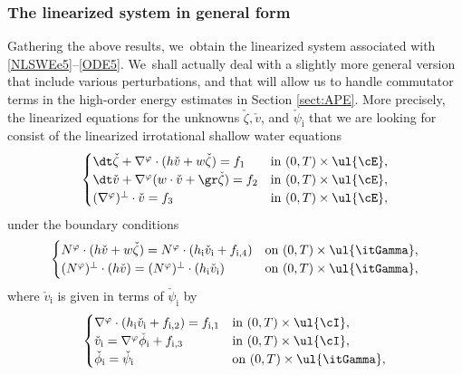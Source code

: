 \subsubsection{The linearized system in general form}
Gathering the above results, we~obtain the linearized system associated with \eqref{NLSWEe5}--\eqref{ODE5}. We~shall actually deal with a slightly more general version that include various perturbations,
and that will allow us to handle commutator terms in the high-order energy estimates in Section \ref{sect:APE}.
More precisely, the linearized equations for the unknowns $\check{\zeta},\check{v}$, and $\check{\psi}_\mathrm{i}$
that we are looking for consist of the linearized irrotational shallow water equations
\begin{equation}\label{LSWEe2}
\begin{cases}
\dt\check{\zeta}+\nabla^\varphi\cdot(h\check{v}+w\check{\zeta}) = f_1 &\text{in } (0,T)\times\ul{\cE}, \\
\dt\check{v}+\nabla^\varphi(w\cdot\check{v}+\gr\check{\zeta}) = f_2 &\text{in } (0,T)\times\ul{\cE}, \\
(\nabla^\varphi)^\perp\cdot\check{v} = f_3 &\text{in } (0,T)\times\ul{\cE},
\end{cases}
\end{equation}
under the boundary conditions
\begin{equation}\label{LBC4}
\begin{cases}
N^\varphi\cdot(h\check{v}+w\check{\zeta}) = N^\varphi\cdot(h_\mathrm{i}\check{v}_\mathrm{i}+f_{{\rm i},4}) &\text{on } (0,T)\times\ul{\itGamma}, \\
(N^\varphi)^\perp\cdot(h\check{v})=(N^\varphi)^\perp\cdot(h_\mathrm{i}\check{v}_\mathrm{i}) &\text{on } (0,T)\times\ul{\itGamma},
\end{cases}
\end{equation}
where $\check{v}_\mathrm{i}$ is given in terms of $\check{\psi}_\mathrm{i}$ by
\begin{equation}\label{LSWEi2}
\begin{cases}
\nabla^\varphi\cdot(h_\mathrm{i}\check{v}_\mathrm{i}+f_{{\rm i},2})=f_{{\rm i},1} &\text{in } (0,T)\times\ul{\cI}, \\
\check{v}_\mathrm{i}=\nabla^\varphi\check{\phi}_\mathrm{i} + f_{{\rm i},3} &\text{in } (0,T)\times\ul{\cI}, \\
\check{\phi}_\mathrm{i}=\check{\psi}_\mathrm{i} &\text{on } (0,T)\times\ul{\itGamma},
\end{cases}
\end{equation}
